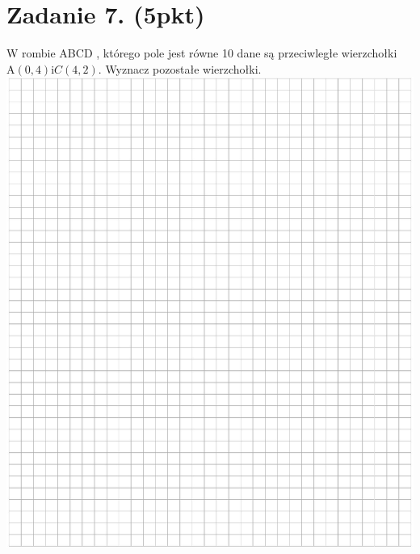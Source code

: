 \documentclass[10pt]{article}
\begin{document}
\section*{Zadanie 7. (5pkt)}
W rombie ABCD , którego pole jest równe 10 dane są przeciwległe wierzchołki \(\mathrm{A}(0,4) \mathrm{i} C(4,2)\). Wyznacz pozostałe wierzchołki.\\
\includegraphics[max width=\textwidth, center]{2024_11_21_498389c978c770348ebcg-05}
\end{document}

